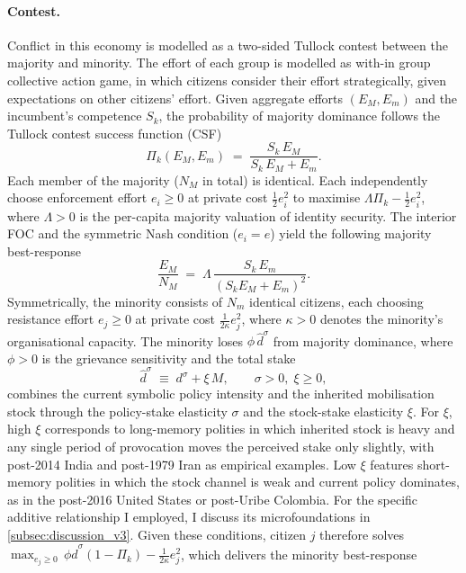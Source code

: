 \documentclass[11pt,twoside]{extarticle}
\begin{document}
\paragraph{Contest.} Conflict in this economy is modelled as a two-sided Tullock contest between the majority and minority. The effort of each group is modelled as with-in group collective action game, in which citizens consider their effort strategically, given expectations on other citizens' effort.
Given aggregate efforts $(E_M,E_m)$ and the incumbent's competence $S_k$, the probability of majority dominance follows the Tullock contest success function (CSF)
\begin{equation}\label{eq:CSF_v3}
    \Pi_k(E_M,E_m)\;=\;\frac{S_k\,E_M}{S_k\,E_M+E_m}.
\end{equation}
Each member of the majority ($N_M$ in total) is identical. Each independently choose enforcement effort $e_i\ge 0$ at private cost $\tfrac{1}{2}e_i^2$ to maximise $\Lambda\Pi_k-\tfrac{1}{2}e_i^2$, where $\Lambda>0$ is the per-capita majority valuation of identity security. The interior FOC and the symmetric Nash condition ($e_i=e$) yield the following majority best-response
\begin{equation}\label{eq:EM_BR_v3}
    \frac{E_M}{N_M}\;=\;\Lambda\,\frac{S_k\,E_m}{(S_k E_M+E_m)^2}.
\end{equation}
Symmetrically, the minority consists of $N_m$ identical citizens, each choosing resistance effort $e_j\ge 0$ at private cost $\tfrac{1}{2\kappa}e_j^2$, where $\kappa>0$ denotes the minority's organisational capacity. The minority loses $\phi\,\hat d^\sigma$ from majority dominance, where $\phi>0$ is the grievance sensitivity and the total stake
\begin{equation}\label{eq:dhat_v3}
    \hat d^\sigma\;\equiv\;d^\sigma+\xi\,M,\qquad\sigma>0,\;\xi\ge 0,
\end{equation}
combines the current symbolic policy intensity and the inherited mobilisation stock through the policy-stake elasticity $\sigma$ and the stock-stake elasticity $\xi$. For $\xi$, high $\xi$ corresponds to long-memory polities in which inherited stock is heavy and any single period of provocation moves the perceived stake only slightly, with post-2014 India and post-1979 Iran as empirical examples.
Low $\xi$ features short-memory polities in which the stock channel is weak and current policy dominates, as in the post-2016 United States or post-Uribe Colombia. For the specific additive relationship I employed, I discuss its microfoundations in \autoref{subsec:discussion_v3}. Given these conditions, citizen $j$ therefore solves $\max_{e_j\ge 0}\,\phi\hat d^\sigma(1-\Pi_k)-\tfrac{1}{2\kappa}e_j^2$, which delivers the minority best-response
\end{document}
